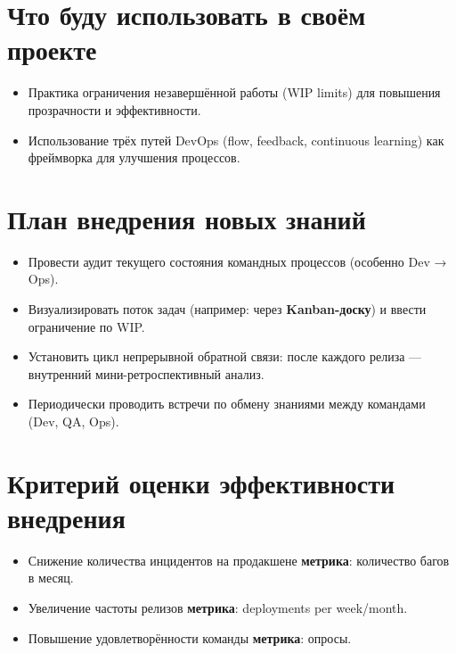 \documentclass[14pt, russian]{matmex-diploma-custom}
\begin{document}
\section{Что буду использовать в своём проекте}

\begin{itemize}
    \item Практика ограничения незавершённой работы (WIP limits) для повышения прозрачности и эффективности.
    \item Использование трёх путей DevOps (flow, feedback, continuous learning) как фреймворка для улучшения процессов.
\end{itemize}

\section{План внедрения новых знаний}

\begin{itemize}
    \item Провести аудит текущего состояния командных процессов (особенно Dev → Ops).
    \item Визуализировать поток задач (например: через \textbf{Kanban-доску}) и ввести ограничение по WIP.
    \item Установить цикл непрерывной обратной связи: после каждого релиза — внутренний мини-ретроспективный анализ.
    \item Периодически проводить встречи по обмену знаниями между командами (Dev, QA, Ops).
\end{itemize}

\section{Критерий оценки эффективности внедрения}

\begin{itemize}
    \item Снижение количества инцидентов на продакшене \textbf{метрика}: количество багов в месяц.
    \item Увеличение частоты релизов \textbf{метрика}: deployments per week/month.
    \item Повышение удовлетворённости команды \textbf{метрика}: опросы.
\end{itemize}
\end{document}
